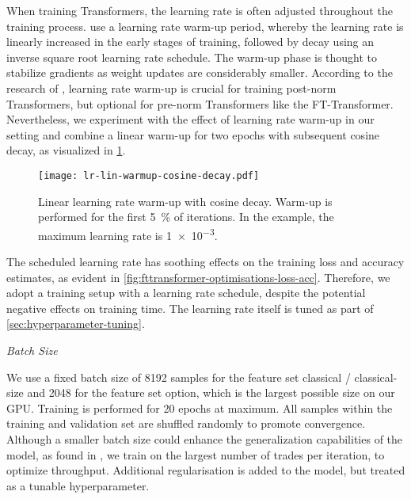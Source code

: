 When training Transformers, the learning rate is often adjusted throughout the training process. \textcite[][7]{vaswaniAttentionAllYou2017} use a learning rate warm-up period, whereby the learning rate is linearly increased in the early stages of training, followed by decay using an inverse square root learning rate schedule. The warm-up phase is thought to stabilize gradients as weight updates are considerably smaller. According to the research of \textcite[][3--4]{xiongLayerNormalizationTransformer2020}, learning rate warm-up is crucial for training post-norm Transformers, but optional for pre-norm Transformers like the FT-Transformer. Nevertheless, we experiment with the effect of learning rate warm-up in our setting and combine a linear warm-up for two epochs with subsequent cosine decay, as visualized in \cref{fig:lr-lin-warmup-cosine-decay}.

\begin{figure}[!ht]
    \centering
    \texttt{[image: lr-lin-warmup-cosine-decay.pdf]}
    \caption[Linear Learning Rate Warm-Up With Cosine Decay]{Linear learning rate warm-up with cosine decay. Warm-up is performed for the first \SI{5}{\percent} of iterations. In the example, the maximum learning rate is \num{1e-3}.}
    \label{fig:lr-lin-warmup-cosine-decay}
\end{figure}

The scheduled learning rate has soothing effects on the training loss and accuracy estimates, as evident in \cref{fig:fttransformer-optimisations-loss-acc}. Therefore, we adopt a training setup with a learning rate schedule, despite the potential negative effects on training time. The learning rate itself is tuned as part of \cref{sec:hyperparameter-tuning}.


\emph{Batch Size}

We use a fixed batch size of \num{8192} samples for the feature set classical / classical-size and \num{2048} for the feature set option, which is the largest possible size on our \gls{GPU}. Training is performed for \num{20} epochs at maximum. All samples within the training and validation set are shuffled randomly to promote convergence. Although a smaller batch size could enhance the generalization capabilities of the model, as found in \textcite[][3]{keskarLargeBatchTrainingDeep2017}, we train on the largest number of trades per iteration, to optimize throughput. Additional regularisation is added to the model, but treated as a tunable hyperparameter.

